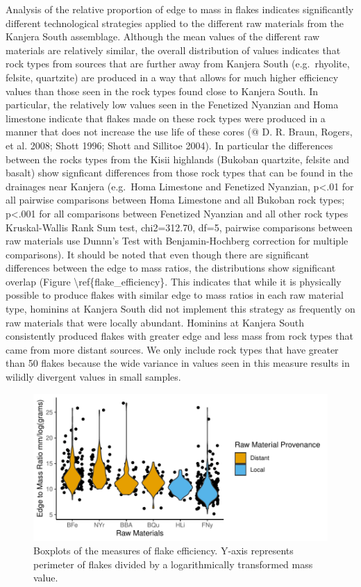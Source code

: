 \documentclass[]{elsarticle} %
\makeatletter
\def\maxwidth{\ifdim\Gin@nat@width>\linewidth\linewidth
\else\Gin@nat@width\fi}
\let\Oldincludegraphics\includegraphics
\renewcommand{\includegraphics}[1]{\Oldincludegraphics[width=\maxwidth]{#1}}
\makeatother
\begin{document}
Analysis of the relative proportion of edge to mass in flakes indicates
significantly different technological strategies applied to the
different raw materials from the Kanjera South assemblage. Although the
mean values of the different raw materials are relatively similar, the
overall distribution of values indicates that rock types from sources
that are further away from Kanjera South (e.g.~rhyolite, felsite,
quartzite) are produced in a way that allows for much higher efficiency
values than those seen in the rock types found close to Kanjera South.
In particular, the relatively low values seen in the Fenetized Nyanzian
and Homa limestone indicate that flakes made on these rock types were
produced in a manner that does not increase the use life of these cores
(@ D. R. Braun, Rogers, et al. 2008; Shott 1996; Shott and Sillitoe
2004). In particular the differences between the rocks types from the
Kisii highlands (Bukoban quartzite, felsite and basalt) show signficant
differences from those rock types that can be found in the drainages
near Kanjera (e.g.~Homa Limestone and Fenetized Nyanzian,
p\textless{}.01 for all pairwise comparisons between Homa Limestone and
all Bukoban rock types; p\textless{}.001 for all comparisons between
Fenetized Nyanzian and all other rock types Kruskal-Wallis Rank Sum
test, chi2=312.70, df=5, pairwise comparisons between raw materials use
Dunnn's Test with Benjamin-Hochberg correction for multiple
comparisons). It should be noted that even though there are significant
differences between the edge to mass ratios, the distributions show
significant overlap (Figure \textbackslash{}ref\{flake\_efficiency\}.
This indicates that while it is physically possible to produce flakes
with similar edge to mass ratios in each raw material type, hominins at
Kanjera South did not implement this strategy as frequently on raw
materials that were locally abundant. Hominins at Kanjera South
consistently produced flakes with greater edge and less mass from rock
types that came from more distant sources. We only include rock types
that have greater than 50 flakes because the wide variance in values
seen in this measure results in wilidly divergent values in small
samples.

\begin{figure}
\centering
\includegraphics{Reeves_Braun_et_al_2020_Kanjera_South_JHE_files/figure-latex/Figure:Flake Effieciency Data-1.pdf}
\caption{Boxplots of the measures of flake efficiency. Y-axis represents
perimeter of flakes divided by a logarithmically transformed mass value.
\label{flake_efficiency}}
\end{figure}
\end{document}
